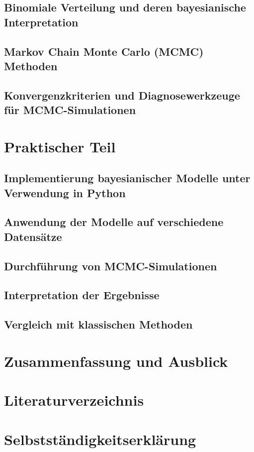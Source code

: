 \documentclass[a4paper,12pt]{article}
\begin{document}
\subsection{Binomiale Verteilung und deren bayesianische Interpretation}
\newpage

\subsection{Markov Chain Monte Carlo (MCMC) Methoden}
\newpage

\subsection{Konvergenzkriterien und Diagnosewerkzeuge für MCMC-Simulationen}
\newpage

\section{Praktischer Teil}

\subsection{Implementierung bayesianischer Modelle unter Verwendung in Python}
\newpage

\subsection{Anwendung der Modelle auf verschiedene Datensätze}
\newpage

\subsection{Durchführung von MCMC-Simulationen}
\newpage

\subsection{Interpretation der Ergebnisse}
\newpage

\subsection{Vergleich mit klassischen Methoden}
\newpage

\section{Zusammenfassung und Ausblick}
\newpage


\section{Literaturverzeichnis} 

\printbibliography 
\newpage

\section{Selbstständigkeitserklärung}
\end{document}
